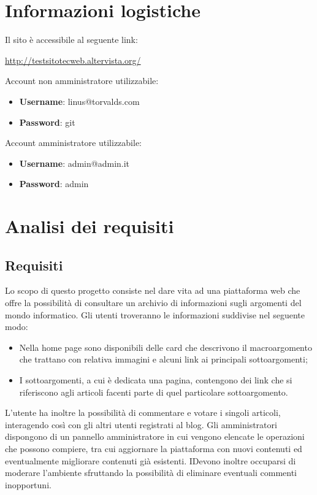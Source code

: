 \documentclass[12pt]{article}
\begin{document}
	
	
	\section*{Informazioni logistiche}
	
	Il sito è accessibile al seguente link:
	\begin{center}
		\url{http://testsitotecweb.altervista.org/}
	\end{center}
	
	Account non amministratore utilizzabile:
	\begin{itemize}
		\item \textbf{Username}: linus@torvalds.com
		\item \textbf{Password}: git
	\end{itemize}
	
	Account amministratore utilizzabile:
	\begin{itemize}
		\item \textbf{Username}: admin@admin.it
		\item \textbf{Password}: admin
	\end{itemize}

	\newpage
	
	\tableofcontents
	
	\newpage

	\section{Analisi dei requisiti}
		\subsection{Requisiti}
		Lo scopo di questo progetto consiste nel dare vita ad una piattaforma web che offre la possibilità di consultare un archivio di informazioni sugli argomenti del mondo informatico. Gli utenti troveranno le informazioni suddivise nel seguente modo:
		\begin{itemize}
			\item Nella home page sono disponibili delle card che descrivono il macroargomento che trattano con relativa immagini e alcuni link ai principali sottoargomenti;
			\item I sottoargomenti, a cui è dedicata una pagina, contengono dei link che si riferiscono agli articoli facenti parte di quel particolare sottoargomento.
		\end{itemize}
		 L'utente ha inoltre la possibilità di commentare e votare i singoli articoli, interagendo così con gli altri utenti registrati al blog. Gli amministratori dispongono di un pannello amministratore in cui vengono elencate le operazioni che possono compiere, tra cui aggiornare la piattaforma con nuovi contenuti ed eventualmente migliorare contenuti già esistenti.
		IDevono inoltre occuparsi di moderare l'ambiente sfruttando la possibilità di eliminare eventuali commenti inopportuni.
\end{document}
